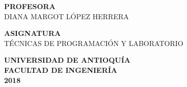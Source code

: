 \documentclass[12pt]{article}
\begin{document}
\begin{center}
\textbf{\large PROFESORA}
\\
\vspace*{0.2cm}
\normalsize DIANA MARGOT LÓPEZ HERRERA
\end{center}

\vspace*{0.6cm}

\begin{center}
\textbf{\large ASIGNATURA}
\\
\vspace*{0.2cm}
\normalsize TÉCNICAS DE PROGRAMACIÓN  Y LABORATORIO
\end{center}


\vspace*{0.6cm}
\begin{center}
\textbf{\large{UNIVERSIDAD DE ANTIOQUÍA\\
\vspace*{0.2cm}
FACULTAD DE INGENIERÍA \\
\vspace*{0.2cm}
2018}}
\end{center}
\pagestyle{empty}
\newpage
\end{document}
